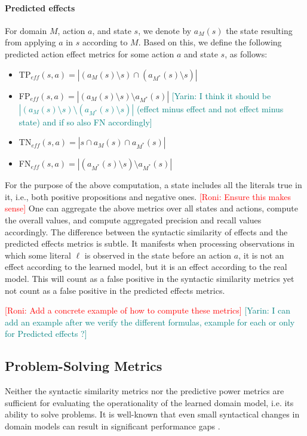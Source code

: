 \documentclass{article}
\theoremstyle{definition}
\theoremstyle{remark}
\newcommand{\realm}{\ensuremath{M^*}\xspace}
\newcommand{\eff}{\ensuremath{\textit{eff}}\xspace}
\newcommand{\roni}[1]{{\textcolor{red}{[Roni: #1]}}}
\newcommand{\mauro}[1]{{\textcolor{green}{[Mauro: #1]}}}
\newcommand{\yarin}[1]{{\textcolor{teal}{[Yarin: #1]}}}
\begin{document}
\paragraph{Predicted effects}
For domain $M$, action $a$, and state $s$, we denote by $a_M(s)$ the state resulting from applying $a$ in $s$ according to $M$. 
Based on this, we define the following predicted action effect metrics for some action $a$ and state $s$, as follows: 
\begin{itemize}
    \item TP$_{\eff}(s,a)=|(a_M(s)\setminus s)\cap (a_\realm(s)\setminus s)|$
    \item FP$_{\eff}(s,a)=|(a_M(s)\setminus s)\setminus a_\realm(s)|$ \yarin{I think it should be $|(a_M(s)\setminus s)\setminus (a_\realm(s)\setminus s)|$ (effect minus effect and not effect minus state) and if so also FN accordingly}
    \item TN$_{\eff}(s,a)=|s \cap a_M(s) \cap a_\realm(s)|$
    \item FN$_{\eff}(s,a)=|(a_\realm(s)\setminus s)\setminus a_\realm(s)|$
\end{itemize}
For the purpose of the above computation, a state includes all the literals true in it, i.e., both positive propositions and negative ones. 
\roni{Ensure this makes sense}
One can aggregate the above metrics over all states and actions, 
compute the overall values, and compute aggregated precision and recall values accordingly.  
The difference between the syntactic similarity of effects and the predicted effects metrics is subtle. 
It manifests when processing observations in which some literal $\ell$ is observed in the state before an action $a$, 
it is not an effect according to the learned model, but it is an effect according to the real model. 
This will count as a false positive in the syntactic similarity metrics yet not count as a false positive in the predicted effects metrics. 

\roni{Add a concrete example of how to compute these metrics}
\yarin{I can add an example after we verify the different formulas, example for each or only for Predicted effects ?}


\subsection{Problem-Solving Metrics}
Neither the syntactic similarity metrics nor the predictive power metrics are sufficient for evaluating the operationality \citep{DBLP:conf/kcap/McCluskeyVV17} of the learned domain model, i.e. its ability to solve problems. It is well-known that even small syntactical changes in domain models can result in significant performance gaps \citep{DBLP:conf/kcap/VallatiC19,vallati2021importance}.
\end{document}
